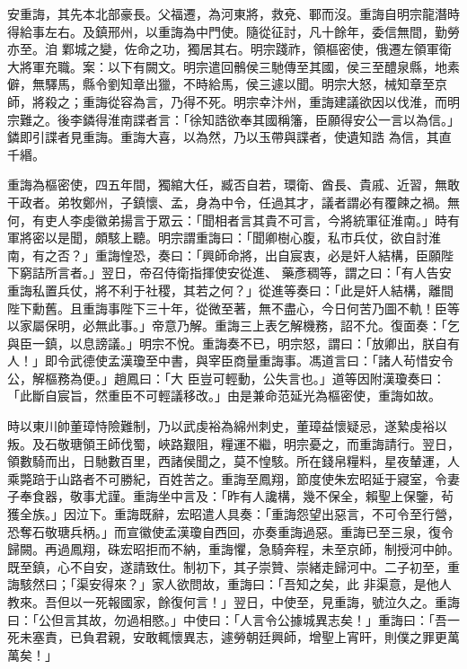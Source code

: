 
\begin{pinyinscope}

 安重誨，其先本北部豪長。父福遷，為河東將，救兗、鄆而沒。重誨自明宗龍潛時得給事左右。及鎮邢州，以重誨為中門使。隨從征討，凡十餘年，委信無間，勤勞亦至。洎
 鄴城之變，佐命之功，獨居其右。明宗踐祚，領樞密使，俄遷左領軍衛大將軍充職。案：以下有闕文。明宗遣回鶻侯三馳傳至其國，侯三至醴泉縣，地素僻，無驛馬，縣令劉知章出獵，不時給馬，侯三遽以聞。明宗大怒，械知章至京師，將殺之；重誨從容為言，乃得不死。明宗幸汴州，重誨建議欲因以伐淮，而明宗難之。後李鏻得淮南諜者言：「徐知誥欲奉其國稱籓，臣願得安公一言以為信。」鏻即引諜者見重誨。重誨大喜，以為然，乃以玉帶與諜者，使遺知誥
 為信，其直千緡。



 重誨為樞密使，四五年間，獨綰大任，臧否自若，環衛、酋長、貴戚、近習，無敢干政者。弟牧鄭州，子鎮懷、孟，身為中令，任過其才，議者謂必有覆餗之禍。無何，有吏人李虔徽弟揚言于眾云：「聞相者言其貴不可言，今將統軍征淮南。」時有軍將密以是聞，頗駭上聽。明宗謂重誨曰：「聞卿樹心腹，私市兵仗，欲自討淮南，有之否？」重誨惶恐，奏曰：「興師命將，出自宸衷，必是奸人結構，臣願陛下窮詰所言者。」翌日，帝召侍衛指揮使安從進、
 藥彥稠等，謂之曰：「有人告安重誨私置兵仗，將不利于社稷，其若之何？」從進等奏曰：「此是奸人結構，離間陛下勳舊。且重誨事陛下三十年，從微至著，無不盡心，今日何苦乃圖不軌！臣等以家屬保明，必無此事。」帝意乃解。重誨三上表乞解機務，詔不允。復面奏：「乞與臣一鎮，以息謗議。」明宗不悅。重誨奏不已，明宗怒，謂曰：「放卿出，朕自有人！」即令武德使孟漢瓊至中書，與宰臣商量重誨事。馮道言曰：「諸人茍惜安令公，解樞務為便。」趙鳳曰：「大
 臣豈可輕動，公失言也。」道等因附漢瓊奏曰：「此斷自宸旨，然重臣不可輕議移改。」由是兼命范延光為樞密使，重誨如故。



 時以東川帥董璋恃險難制，乃以武虔裕為綿州刺史，董璋益懷疑忌，遂縶虔裕以叛。及石敬瑭領王師伐蜀，峽路艱阻，糧運不繼，明宗憂之，而重誨請行。翌日，領數騎而出，日馳數百里，西諸侯聞之，莫不惶駭。所在錢帛糧料，星夜輦運，人乘斃踣于山路者不可勝紀，百姓苦之。重誨至鳳翔，節度使朱宏昭延于寢室，令妻
 子奉食器，敬事尤謹。重誨坐中言及：「昨有人讒構，幾不保全，賴聖上保鑒，茍獲全族。」因泣下。重誨既辭，宏昭遣人具奏：「重誨怨望出惡言，不可令至行營，恐奪石敬瑭兵柄。」而宣徽使孟漢瓊自西回，亦奏重誨過惡。重誨已至三泉，復令歸闕。再過鳳翔，硃宏昭拒而不納，重誨懼，急騎奔程，未至京師，制授河中帥。既至鎮，心不自安，遂請致仕。制初下，其子崇贊、崇緒走歸河中。二子初至，重誨駭然曰；「渠安得來？」家人欲問故，重誨曰：「吾知之矣，此
 非渠意，是他人教來。吾但以一死報國家，餘復何言！」翌日，中使至，見重誨，號泣久之。重誨曰：「公但言其故，勿過相愍。」中使曰：「人言令公據城異志矣！」重誨曰：「吾一死未塞責，已負君親，安敢輒懷異志，遽勞朝廷興師，增聖上宵旰，則僕之罪更萬萬矣！」




\end{pinyinscope}
